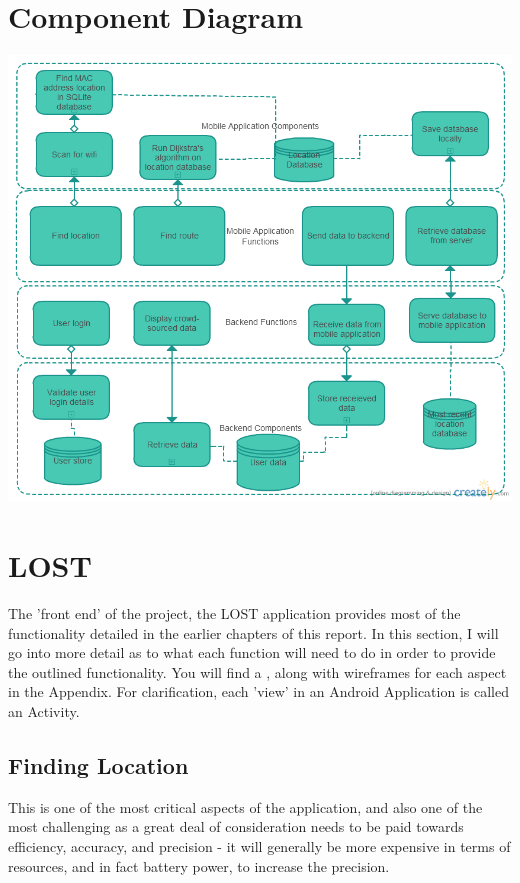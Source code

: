\documentclass[11pt]{informatics-report}
\begin{document}
\section{Component Diagram}
\centerline{\includegraphics[scale=0.6]{ComponentDiagram}}
\newpage

\section{LOST}

The 'front end' of the project, the LOST application provides most of the functionality detailed in the earlier chapters of this report. In this section, I will go into more detail as to what each function will need to do in order to provide the outlined functionality. You will find a , along with wireframes for each aspect in the Appendix. For clarification, each 'view' in an Android Application is called an Activity.

\subsection{Finding Location}

This is one of the most critical aspects of the application, and also one of the most challenging as a great deal of consideration needs to be paid towards efficiency, accuracy, and precision - it will generally be more expensive in terms of resources, and in fact battery power, to increase the precision.
\end{document}

